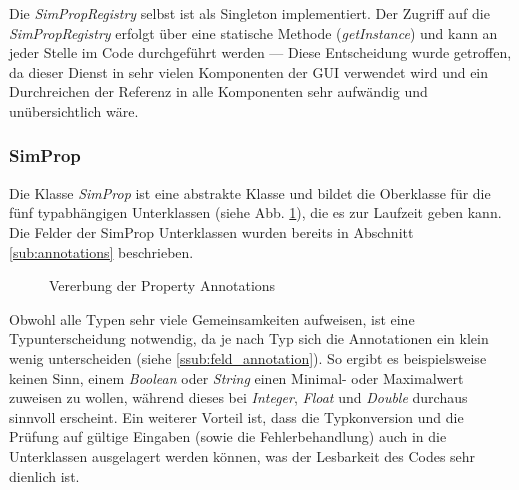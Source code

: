 \documentclass[a4paper, 11pt]{article} %
\begin{document}
Die \emph{SimPropRegistry} selbst ist als Singleton implementiert. Der Zugriff auf die \emph{SimPropRegistry} erfolgt über eine statische Methode (\emph{getInstance}) und kann an jeder Stelle im Code durchgeführt werden --- Diese Entscheidung wurde getroffen, da dieser Dienst in sehr vielen Komponenten der GUI verwendet wird und ein Durchreichen der Referenz in alle Komponenten sehr aufwändig und unübersichtlich wäre. 

\subsubsection{SimProp} %
\label{ssub:simprop}
Die Klasse \emph{SimProp} ist eine abstrakte Klasse und bildet die Oberklasse für die fünf typabhängigen Unterklassen (siehe Abb. \ref{fig:field_annotation}), die es zur Laufzeit geben kann. Die Felder der SimProp Unterklassen wurden bereits in Abschnitt \ref{sub:annotations} beschrieben. \\

\begin{figure}[!htp]
\caption{Vererbung der Property Annotations}
\label{fig:field_annotation}
\end{figure}

 Obwohl alle Typen sehr viele Gemeinsamkeiten aufweisen, ist eine Typunterscheidung notwendig, da je nach Typ sich die Annotationen ein klein wenig unterscheiden (siehe \ref{ssub:feld_annotation}). So ergibt es beispielsweise keinen Sinn, einem \emph{Boolean} oder \emph{String} einen Minimal- oder Maximalwert zuweisen zu wollen, während dieses bei \emph{Integer}, \emph{Float} und \emph{Double} durchaus sinnvoll erscheint. Ein weiterer Vorteil ist, dass die Typkonversion und die Prüfung auf gültige Eingaben (sowie die Fehlerbehandlung) auch in die Unterklassen ausgelagert werden können, was der Lesbarkeit des Codes sehr dienlich ist. 
\end{document}
